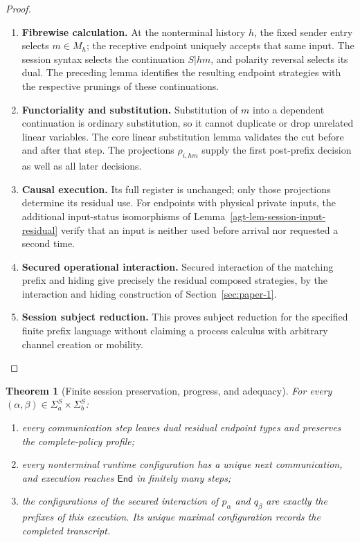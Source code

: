 \documentclass[11pt,a4paper]{article}
\numberwithin{equation}{section}
\newtheorem{theorem}{Theorem}[section]
\theoremstyle{definition}
\theoremstyle{remark}
\theoremstyle{plain}
\providecommand{\End}{\mathsf{End}}
\begin{document}
\begin{proof}
\leavevmode
\begin{enumerate}[label=\textup{(\arabic*)},leftmargin=*,itemsep=4pt,topsep=3pt]
  \item \textbf{Fibrewise calculation.} At the nonterminal history $h$, the fixed sender entry selects
$m\in M_h$; the receptive endpoint uniquely accepts that same input. The session syntax selects the continuation $S|hm$, and polarity
reversal selects its dual. The preceding lemma identifies the resulting
endpoint strategies with the respective prunings of these continuations.
  \item \textbf{Functoriality and substitution.} Substitution of $m$ into a dependent continuation is ordinary
substitution, so it cannot duplicate or drop unrelated linear variables. The core linear substitution lemma validates the cut before and after
that step. The projections $\rho_{i,hm}$ supply the first
post-prefix decision as well as all later decisions.
  \item \textbf{Causal execution.} Its full register
is unchanged; only those projections determine its residual use. For endpoints with physical private inputs, the additional input-status
isomorphisms of Lemma~\ref{agt-lem-session-input-residual}
verify that an input is neither used before arrival nor requested a
second time.
  \item \textbf{Secured operational interaction.} Secured interaction of the
matching prefix and hiding give precisely the residual composed
strategies, by the interaction and hiding construction of Section~\ref{sec:paper-1}.
  \item \textbf{Session subject reduction.} This proves subject reduction for the specified finite
prefix language without claiming a process calculus with arbitrary
channel creation or mobility.
\end{enumerate}
\end{proof}


\begin{theorem}[Finite session preservation, progress, and adequacy]
\label{agt-thm-session}
For every $(\alpha,\beta)\in\Sigma_a^S\times\Sigma_b^S$:
\begin{enumerate}[label=(\roman*),nosep]
\item every communication step leaves dual residual endpoint types and
preserves the complete-policy profile;
\item every nonterminal runtime configuration has a unique next
communication, and execution reaches $\End$ in finitely many steps;
\item the configurations of the secured interaction of $p_\alpha$ and
$q_\beta$ are exactly the prefixes of this execution. Its unique maximal
configuration records the completed transcript.
\end{enumerate}
\end{theorem}
\end{document}
